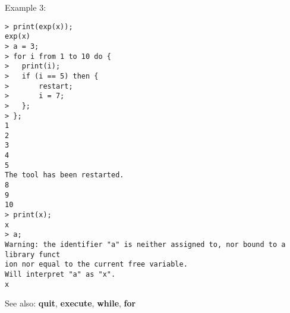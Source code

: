 \noindent Example 3: 
\begin{center}\begin{minipage}{15cm}\begin{Verbatim}[frame=single]
> print(exp(x));
exp(x)
> a = 3;
> for i from 1 to 10 do {
> 	print(i);
> 	if (i == 5) then {
> 		restart;
> 		i = 7;
> 	};
> };
1
2
3
4
5
The tool has been restarted.
8
9
10
> print(x);
x
> a;
Warning: the identifier "a" is neither assigned to, nor bound to a library funct
ion nor equal to the current free variable.
Will interpret "a" as "x".
x
\end{Verbatim}
\end{minipage}\end{center}
See also: \textbf{quit}, \textbf{execute}, \textbf{while}, \textbf{for}
